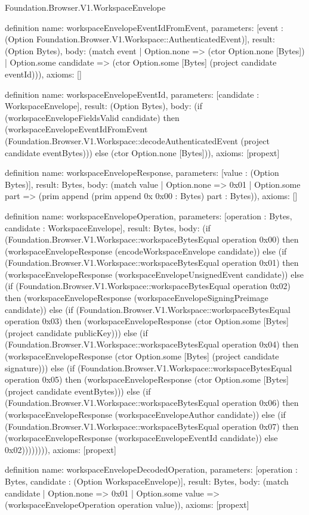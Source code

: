\begin{lexlean}{Foundation.Browser.V1.WorkspaceEnvelope}
\begin{semanticmodule}
definition{
  name: workspaceEnvelopeEventIdFromEvent,
  parameters: [event : (Option Foundation.Browser.V1.Workspace::AuthenticatedEvent)],
  result: (Option Bytes),
  body: (match event
    | Option.none => (ctor Option.none [Bytes])
    | Option.some candidate => (ctor Option.some [Bytes] (project candidate eventId))),
  axioms: []
}

definition{
  name: workspaceEnvelopeEventId,
  parameters: [candidate : WorkspaceEnvelope],
  result: (Option Bytes),
  body: (if (workspaceEnvelopeFieldsValid candidate) then (workspaceEnvelopeEventIdFromEvent (Foundation.Browser.V1.Workspace::decodeAuthenticatedEvent (project candidate eventBytes))) else (ctor Option.none [Bytes])),
  axioms: [propext]
}

definition{
  name: workspaceEnvelopeResponse,
  parameters: [value : (Option Bytes)],
  result: Bytes,
  body: (match value
    | Option.none => 0x01
    | Option.some part => (prim append (prim append 0x 0x00 : Bytes) part : Bytes)),
  axioms: []
}

definition{
  name: workspaceEnvelopeOperation,
  parameters: [operation : Bytes, candidate : WorkspaceEnvelope],
  result: Bytes,
  body: (if (Foundation.Browser.V1.Workspace::workspaceBytesEqual operation 0x00) then (workspaceEnvelopeResponse (encodeWorkspaceEnvelope candidate)) else (if (Foundation.Browser.V1.Workspace::workspaceBytesEqual operation 0x01) then (workspaceEnvelopeResponse (workspaceEnvelopeUnsignedEvent candidate)) else (if (Foundation.Browser.V1.Workspace::workspaceBytesEqual operation 0x02) then (workspaceEnvelopeResponse (workspaceEnvelopeSigningPreimage candidate)) else (if (Foundation.Browser.V1.Workspace::workspaceBytesEqual operation 0x03) then (workspaceEnvelopeResponse (ctor Option.some [Bytes] (project candidate publicKey))) else (if (Foundation.Browser.V1.Workspace::workspaceBytesEqual operation 0x04) then (workspaceEnvelopeResponse (ctor Option.some [Bytes] (project candidate signature))) else (if (Foundation.Browser.V1.Workspace::workspaceBytesEqual operation 0x05) then (workspaceEnvelopeResponse (ctor Option.some [Bytes] (project candidate eventBytes))) else (if (Foundation.Browser.V1.Workspace::workspaceBytesEqual operation 0x06) then (workspaceEnvelopeResponse (workspaceEnvelopeAuthor candidate)) else (if (Foundation.Browser.V1.Workspace::workspaceBytesEqual operation 0x07) then (workspaceEnvelopeResponse (workspaceEnvelopeEventId candidate)) else 0x02)))))))),
  axioms: [propext]
}

definition{
  name: workspaceEnvelopeDecodedOperation,
  parameters: [operation : Bytes, candidate : (Option WorkspaceEnvelope)],
  result: Bytes,
  body: (match candidate
    | Option.none => 0x01
    | Option.some value => (workspaceEnvelopeOperation operation value)),
  axioms: [propext]
}


\end{semanticmodule}
\end{lexlean}
